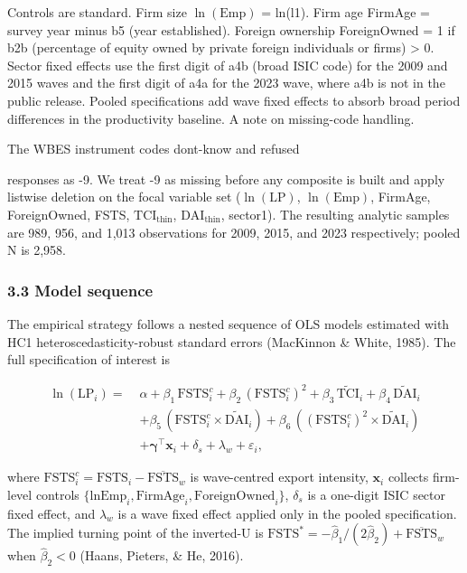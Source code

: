 \documentclass[12pt,a4paper]{article}
\begin{document}
Controls are standard. Firm size \(\ln(\mathrm{Emp})\) = ln(l1). Firm
age FirmAge = survey year minus b5 (year established). Foreign ownership
ForeignOwned = 1 if b2b (percentage of equity owned by private foreign
individuals or firms) \textgreater{} 0. Sector fixed effects use the
first digit of a4b (broad ISIC code) for the 2009 and 2015 waves and the
first digit of a4a for the 2023 wave, where a4b is not in the public
release. Pooled specifications add wave fixed effects to absorb broad
period differences in the productivity baseline. A note on missing-code
handling.

The WBES instrument codes don\textquotesingle t-know and refused

responses as -9. We treat -9 as missing before any composite is built
and apply listwise deletion on the focal variable set
(\(\ln(\mathrm{LP})\), \(\ln(\mathrm{Emp})\), FirmAge, ForeignOwned,
FSTS, \(\mathrm{TCI}_{\text{thin}}\), \(\mathrm{DAI}_{\text{thin}}\),
sector1). The resulting analytic samples are 989, 956, and 1,013
observations for 2009, 2015, and 2023 respectively; pooled N is 2,958.

\hypertarget{33-model-sequence}{%
\subsubsection{3.3 Model sequence}\label{33-model-sequence}}

The empirical strategy follows a nested sequence of OLS models estimated
with HC1 heteroscedasticity-robust standard errors (MacKinnon \& White,
1985). The full specification of interest is

\[
\begin{aligned}
\ln(\mathrm{LP}_i) =\;& \alpha + \beta_1\,\mathrm{FSTS}^{c}_i + \beta_2\,(\mathrm{FSTS}^{c}_i)^2 + \beta_3\,\tilde{\mathrm{TCI}}_i + \beta_4\,\tilde{\mathrm{DAI}}_i \\
& + \beta_5\,(\mathrm{FSTS}^{c}_i \times \tilde{\mathrm{DAI}}_i) + \beta_6\,((\mathrm{FSTS}^{c}_i)^2 \times \tilde{\mathrm{DAI}}_i) \\
& + \boldsymbol{\gamma}^{\top}\!\mathbf{x}_i + \delta_s + \lambda_w + \varepsilon_i,
\end{aligned}
\]

where
\(\mathrm{FSTS}^{c}_i = \mathrm{FSTS}_i - \overline{\mathrm{FSTS}}_w\)
is wave-centred export intensity, \(\mathbf{x}_i\) collects firm-level
controls
\(\{\mathrm{lnEmp}_i, \mathrm{FirmAge}_i, \mathrm{ForeignOwned}_i\}\),
\(\delta_s\) is a one-digit ISIC sector fixed effect, and \(\lambda_w\)
is a wave fixed effect applied only in the pooled specification. The
implied turning point of the inverted-U is
\(\mathrm{FSTS}^{*} = -\hat\beta_1/(2\hat\beta_2) + \overline{\mathrm{FSTS}}_w\)
when \(\hat\beta_2 < 0\) (Haans, Pieters, \& He, 2016).
\end{document}
